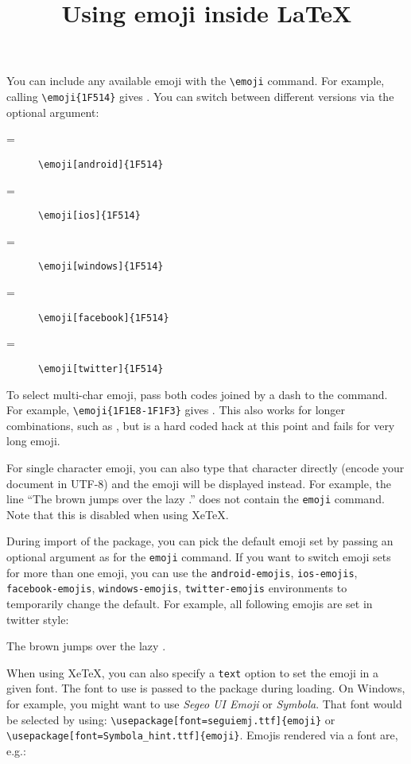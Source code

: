 \documentclass{article}
\title{Using emoji inside \LaTeX}
\newcommand{\dogline}{The \emoji{23E9} brown \emoji{1F43A} jumps over the lazy \emoji{1F436}.}
\newcommand{\dogline}{The \emoji{23E9} brown \emoji{1F43A} jumps over the lazy \emoji{1F436}.}
\newcommand{\dogline}{The ⏩ brown 🐺 jumps over the lazy 🐶.}
\begin{document}
\maketitle

You can include any available emoji with the \verb|\emoji| command. For example, calling \verb|\emoji{1F514}| gives . You can switch between different versions via the optional argument:
\begin{description}
\item[{} =] \verb|\emoji[android]{1F514}|
\item[{} =] \verb|\emoji[ios]{1F514}|
\item[{} =] \verb|\emoji[windows]{1F514}|
\item[{} =] \verb|\emoji[facebook]{1F514}|
\item[{} =] \verb|\emoji[twitter]{1F514}|
\end{description}
To select multi-char emoji, pass both codes joined by a dash to the command. For example, \verb|\emoji{1F1E8-1F1F3}| gives .
This also works for longer combinations, such as , but is a hard coded hack at this point and fails for very long emoji.

For single character emoji, you can also type that character directly (encode your document in UTF-8) and the emoji will be displayed instead. For example, the line ``\dogline'' does not contain the \verb|emoji| command. Note that this is disabled when using XeTeX. 

During import of the package, you can pick the default emoji set by passing an optional argument as for the \verb|emoji| command. If you want to switch emoji sets for more than one emoji, you can use the \verb|android-emojis|, \verb|ios-emojis|, \verb|facebook-emojis|, \verb|windows-emojis|, \verb|twitter-emojis| environments to temporarily change the default. For example, all following emojis are set in twitter style:
\begin{twitter-emojis}
\dogline
\end{twitter-emojis}

When using XeTeX, you can also specify a \verb|text| option to set the emoji in a given font. The font to use is passed to the package during loading. On Windows, for example, you might want to use \textit{Segeo UI Emoji} or \textit{Symbola}. That font would be selected by using: \verb|\usepackage[font=seguiemj.ttf]{emoji}| or \verb|\usepackage[font=Symbola_hint.ttf]{emoji}|. Emojis rendered via a font are, e.g.: 
\begin{text-emojis}
  
\end{text-emojis}
\end{document}

